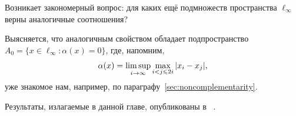 Возникает закономерный вопрос: для каких ещё подмножеств пространства $\ell_\infty$
верны аналогичные соотношения?

Выясняется, что аналогичным свойством обладает подпространство
$A_0 = \{ x \in \ell_\infty : \alpha(x) =0 \}$,
где, напомним,
\begin{equation*}
	\alpha(x) = \varlimsup_{i\to\infty} \max_{i<j\leqslant 2i} |x_i - x_j|
	,
\end{equation*}
уже знакомое нам, например, по параграфу~\ref{sec:noncomplementarity}.

Результаты, излагаемые в данной главе, опубликованы в%
~\cite{
our-mz2021linearhulls,
avdeev2021vestnik,
avdeev2022measure,
}.
